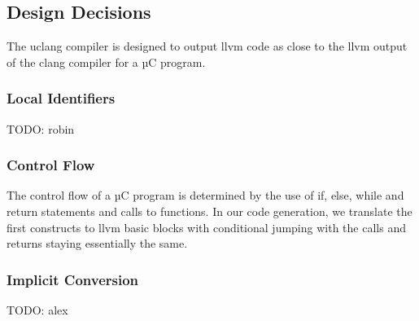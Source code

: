 \subsection{Design Decisions}

The uclang compiler is designed to output llvm code as close to the llvm output of the clang compiler for a µC program.


\subsubsection{Local Identifiers}
TODO: robin

\subsubsection{Control Flow}
The control flow of a µC program is determined by the use of if, else, while and return statements and calls to functions. In our code generation, we translate the first constructs to llvm basic blocks with conditional jumping with the calls and returns staying essentially the same.

\subsubsection{Implicit Conversion}
TODO: alex
